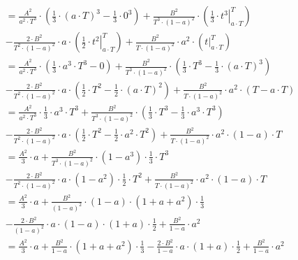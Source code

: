 \begin{task}
\begin{align*}
 &=\frac{A^2}{a^2 \cdot T^3}\cdot \left(\frac{1}{3}\cdot \left(a \cdot T\right)^3 - \frac{1}{3}\cdot 0^3 \right)
 +\frac{B^2}{T^3 \cdot \left(1 - a \right)^2}\cdot \left( \left. \frac{1}{3} \cdot t^3 \right|_{a \cdot T}^{T} \right) \\
 &- \frac{2\cdot B^2}{T^2 \cdot \left(1 - a\right)^2}\cdot a \cdot \left( \left. \frac{1}{2} \cdot t^2 \right|_{a \cdot T}^{T} \right)
 + \frac{B^2}{T \cdot \left(1 - a \right)^2} \cdot a^2 \cdot \left( \left. t \right|_{a \cdot T}^{T} \right)\\
 &=\frac{A^2}{a^2 \cdot T^3}\cdot \left(\frac{1}{3}\cdot a^3 \cdot T^3 - 0 \right)
 +\frac{B^2}{T^3 \cdot \left(1 - a \right)^2}\cdot \left( \frac{1}{3} \cdot T^3 -\frac{1}{3} \cdot \left( a\cdot T \right)^3 \right) \\
 &- \frac{2\cdot B^2}{T^2\cdot \left(1 - a\right)^2}\cdot a \cdot \left( \frac{1}{2} \cdot T^2 -  \frac{1}{2} \cdot \left(a \cdot T\right)^2 \right)
 + \frac{B^2}{T \cdot \left(1 - a \right)^2} \cdot a^2 \cdot \left( T - a \cdot T \right)\\
 &=\frac{A^2}{a^2 \cdot T^3}\cdot \frac{1}{3}\cdot a^3 \cdot T^3
 +\frac{B^2}{T^3 \cdot \left(1 - a \right)^2}\cdot \left( \frac{1}{3} \cdot T^3 -\frac{1}{3} \cdot a^3 \cdot T ^3 \right) \\
 &- \frac{2\cdot B^2}{T^2 \cdot \left(1 - a\right)^2}\cdot a \cdot \left( \frac{1}{2} \cdot T^2 -  \frac{1}{2} \cdot a^2 \cdot T^2 \right)
 + \frac{B^2}{T \cdot \left(1 - a \right)^2} \cdot a^2 \cdot \left( 1 - a\right) \cdot T\\
 &=\frac{A^2}{3}\cdot a
 +\frac{B^2}{T^3 \cdot \left(1 - a \right)^2}\cdot \left(1 -a^3 \right)\cdot \frac{1}{3} \cdot T^3 \\
 &- \frac{2\cdot B^2}{T^2\cdot \left(1 - a\right)^2}\cdot a \cdot \left( 1 -   a^2 \right) \cdot \frac{1}{2} \cdot T^2
 + \frac{B^2}{T \cdot \left(1 - a \right)^2} \cdot a^2 \cdot \left( 1 - a\right) \cdot T\\ 
 &=\frac{A^2}{3}\cdot a
 +\frac{B^2}{\left(1 - a\right)^2}\cdot \left(1-a\right)\cdot \left(1 +a + a^2 \right)\cdot \frac{1}{3}\\
 &- \frac{2\cdot B^2}{\left(1 - a\right)^2}\cdot a \cdot \left( 1 - a \right) \cdot \left( 1 + a \right) \cdot \frac{1}{2}
 + \frac{B^2}{1 - a} \cdot a^2\\
 &=\frac{A^2}{3}\cdot a
 +\frac{B^2}{1 - a}\cdot \left(1 +a + a^2 \right)\cdot \frac{1}{3}
 - \frac{2\cdot B^2}{1 - a}\cdot a \cdot \left( 1 + a \right) \cdot \frac{1}{2}
 + \frac{B^2}{1 - a} \cdot a^2\\

\end{align*}
\end{task}
